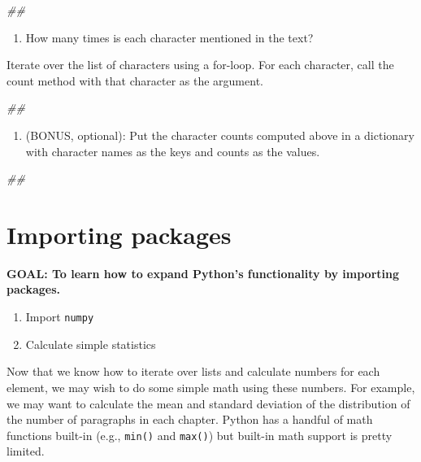 \documentclass[
]{book}
\newenvironment{Shaded}{\begin{snugshade}}{\end{snugshade}}
\newcommand{\CommentTok}[1]{\textcolor[rgb]{0.56,0.35,0.01}{\textit{#1}}}
\providecommand{\tightlist}{%
  \setlength{\itemsep}{0pt}\setlength{\parskip}{0pt}}
\begin{document}
\begin{Shaded}
\begin{Highlighting}[]
\CommentTok{##}
\end{Highlighting}
\end{Shaded}

\begin{enumerate}
\def\labelenumi{\arabic{enumi}.}
\setcounter{enumi}{2}
\tightlist
\item
  How many times is each character mentioned in the text?
\end{enumerate}

Iterate over the list of characters using a for-loop.
For each character, call the count method with that character as the argument.

\begin{Shaded}
\begin{Highlighting}[]
\CommentTok{##}
\end{Highlighting}
\end{Shaded}

\begin{enumerate}
\def\labelenumi{\arabic{enumi}.}
\setcounter{enumi}{3}
\tightlist
\item
  (BONUS, optional): Put the character counts computed
  above in a dictionary with character names as the keys and
  counts as the values.
\end{enumerate}

\begin{Shaded}
\begin{Highlighting}[]
\CommentTok{##}
\end{Highlighting}
\end{Shaded}

\hypertarget{importing-packages}{%
\section{Importing packages}\label{importing-packages}}

\textbf{GOAL: To learn how to expand Python's functionality by importing packages.}

\begin{enumerate}
\def\labelenumi{\arabic{enumi}.}
\tightlist
\item
  Import \texttt{numpy}
\item
  Calculate simple statistics
\end{enumerate}

Now that we know how to iterate over lists and calculate numbers for each element, we may wish to do some simple math using these numbers. For example, we may want to calculate the mean and standard deviation of the distribution of the number of paragraphs in each chapter. Python has a handful of math functions built-in (e.g., \texttt{min()} and \texttt{max()}) but built-in math support is pretty limited.
\end{document}
